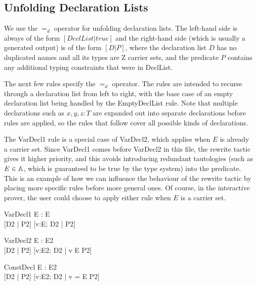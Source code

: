 \documentclass{entcs}
\newcommand{\declListUnfoldsTo}{\mathrel{=_d}}
\begin{document}
\subsection{Unfolding Declaration Lists}

We use the $\declListUnfoldsTo$ operator for unfolding declaration
lists.   The left-hand side is always of the form $[DeclList|true]$
and the right-hand side (which is usually a generated output) is
of the form $[D|P]$, where the declaration list $D$ has no duplicated
names and all its types are Z carrier sets, and the predicate $P$
contains any additional typing constraints that were in DeclList.

The next few rules specify the $\declListUnfoldsTo$ operator.
The rules are intended to recurse through a declaration list from left
to right, with the base case of an empty declaration list being handled
by the EmptyDeclList rule.  Note that multiple declarations such as
$x,y,z:T$ are expanded out into separate declarations before rules
are applied, so the rules that follow cover all possible kinds
of declarations.

The VarDecl1 rule is a special case of VarDecl2, which applies when $E$ is
already a carrier set.  Since VarDecl1 comes before VarDecl2 in this file,
the rewrite tactic gives it higher priority, and this avoids introducing
redundant tautologies (such as $E \in {\mathbb A}$, which is guaranteed to
be true by the type system) into the predicate.  This is an example of
how we can influence the behaviour of the rewrite tactic by placing more
specific rules before more general ones.  Of course, in the interactive
prover, the user could choose to apply either rule when $E$ is a
carrier set.

\begin{zedrule}{VarDecl1}
   \proviso E : \power E \\
   [D1 | true] \declListUnfoldsTo [D2 | P2]
\derives
   [v:E; D1 | true] \declListUnfoldsTo [v:E; D2 |  P2]
\end{zedrule}

\begin{zedrule}{VarDecl2}
   \proviso E : \power E2 \\
   [D1 | true] \declListUnfoldsTo [D2 | P2]
\derives
   [v:E; D1 | true] \declListUnfoldsTo [v:E2; D2 |  v \in E \land P2]
\end{zedrule}

\begin{zedrule}{ConstDecl}
   \proviso E : E2 \\
   [D1 | true] \declListUnfoldsTo [D2 | P2]
\derives
   [v==E; D1 | true] \declListUnfoldsTo [v:E2; D2 |  v = E \land P2]
\end{zedrule}
\end{document}
